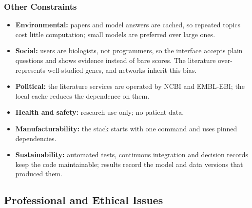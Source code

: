 \documentclass[11pt,a4paper]{article}
\begin{document}
\subsubsection{Other Constraints}
\begin{itemize}
  \item \textbf{Environmental:} papers and model answers are cached, so repeated topics cost
    little computation; small models are preferred over large ones.
  \item \textbf{Social:} users are biologists, not programmers, so the interface accepts plain
    questions and shows evidence instead of bare scores. The literature over-represents
    well-studied genes, and networks inherit this bias.
  \item \textbf{Political:} the literature services are operated by NCBI and EMBL-EBI; the local
    cache reduces the dependence on them.
  \item \textbf{Health and safety:} research use only; no patient data.
  \item \textbf{Manufacturability:} the stack starts with one command and uses pinned
    dependencies.
  \item \textbf{Sustainability:} automated tests, continuous integration and decision records keep
    the code maintainable; results record the model and data versions that produced them.
\end{itemize}

\subsection{Professional and Ethical Issues}
\end{document}
